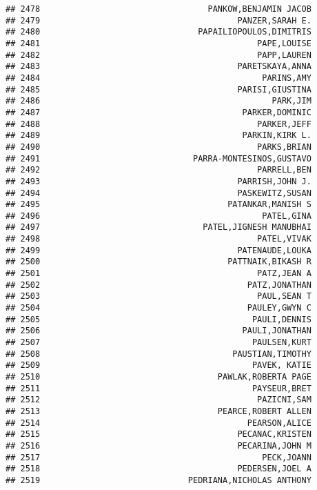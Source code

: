 \documentclass[
]{article}
\begin{document}
\begin{verbatim}
## 2478                                  PANKOW,BENJAMIN JACOB
## 2479                                        PANZER,SARAH E.
## 2480                                PAPAILIOPOULOS,DIMITRIS
## 2481                                            PAPE,LOUISE
## 2482                                            PAPP,LAUREN
## 2483                                        PARETSKAYA,ANNA
## 2484                                             PARINS,AMY
## 2485                                        PARISI,GIUSTINA
## 2486                                               PARK,JIM
## 2487                                         PARKER,DOMINIC
## 2488                                            PARKER,JEFF
## 2489                                         PARKIN,KIRK L.
## 2490                                            PARKS,BRIAN
## 2491                               PARRA-MONTESINOS,GUSTAVO
## 2492                                            PARRELL,BEN
## 2493                                        PARRISH,JOHN J.
## 2494                                        PASKEWITZ,SUSAN
## 2495                                      PATANKAR,MANISH S
## 2496                                             PATEL,GINA
## 2497                                 PATEL,JIGNESH MANUBHAI
## 2498                                            PATEL,VIVAK
## 2499                                        PATENAUDE,LOUKA
## 2500                                      PATTNAIK,BIKASH R
## 2501                                            PATZ,JEAN A
## 2502                                          PATZ,JONATHAN
## 2503                                            PAUL,SEAN T
## 2504                                          PAULEY,GWYN C
## 2505                                           PAULI,DENNIS
## 2506                                         PAULI,JONATHAN
## 2507                                           PAULSEN,KURT
## 2508                                       PAUSTIAN,TIMOTHY
## 2509                                           PAVEK, KATIE
## 2510                                    PAWLAK,ROBERTA PAGE
## 2511                                           PAYSEUR,BRET
## 2512                                            PAZICNI,SAM
## 2513                                    PEARCE,ROBERT ALLEN
## 2514                                          PEARSON,ALICE
## 2515                                        PECANAC,KRISTEN
## 2516                                        PECARINA,JOHN M
## 2517                                             PECK,JOANN
## 2518                                        PEDERSEN,JOEL A
## 2519                              PEDRIANA,NICHOLAS ANTHONY

\end{verbatim}
\end{document}
